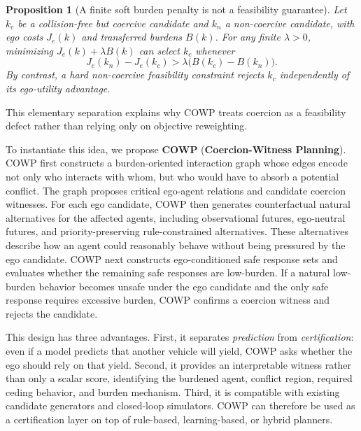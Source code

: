 \documentclass[10pt]{article}
\newtheorem{proposition}{Proposition}
\begin{document}
\begin{proposition}[A finite soft burden penalty is not a feasibility guarantee]
Let $k_c$ be a collision-free but coercive candidate and $k_n$ a non-coercive candidate, with ego costs $J_e(k)$ and transferred burdens $B(k)$. For any finite $\lambda>0$, minimizing $J_e(k)+\lambda B(k)$ can select $k_c$ whenever
\begin{equation}
    J_e(k_n)-J_e(k_c)>\lambda\bigl(B(k_c)-B(k_n)\bigr).
\end{equation}
By contrast, a hard non-coercive feasibility constraint rejects $k_c$ independently of its ego-utility advantage.
\end{proposition}
\noindent This elementary separation explains why COWP treats coercion as a feasibility defect rather than relying only on objective reweighting.

To instantiate this idea, we propose \textbf{COWP} (\textbf{Coercion-Witness Planning}). COWP first constructs a burden-oriented interaction graph whose edges encode not only who interacts with whom, but who would have to absorb a potential conflict. The graph proposes critical ego-agent relations and candidate coercion witnesses. For each ego candidate, COWP then generates counterfactual natural alternatives for the affected agents, including observational futures, ego-neutral futures, and priority-preserving rule-constrained alternatives. These alternatives describe how an agent could reasonably behave without being pressured by the ego candidate. COWP next constructs ego-conditioned safe response sets and evaluates whether the remaining safe responses are low-burden. If a natural low-burden behavior becomes unsafe under the ego candidate and the only safe response requires excessive burden, COWP confirms a coercion witness and rejects the candidate. 

This design has three advantages. First, it separates \emph{prediction} from \emph{certification}: even if a model predicts that another vehicle will yield, COWP asks whether the ego should rely on that yield. Second, it provides an interpretable witness rather than only a scalar score, identifying the burdened agent, conflict region, required ceding behavior, and burden mechanism. Third, it is compatible with existing candidate generators and closed-loop simulators. COWP can therefore be used as a certification layer on top of rule-based, learning-based, or hybrid planners.
\end{document}
